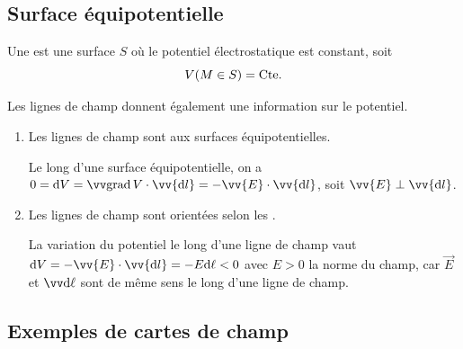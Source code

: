 \documentclass[12pt,fancy]{cours}
\begin{document}
%
%



\subsection{Surface équipotentielle}

\begin{definition}
Une   est une surface $S$ où le potentiel électrostatique est constant, soit
\begin{equation*}
V(M\in S) = \text{Cte}.
\end{equation*}
\end{definition}
\noindent Les lignes de champ donnent également une information sur le potentiel.
\begin{enumerate}
  \item Les lignes de champ sont  aux surfaces équipotentielles.
  
  \begin{preuve}
    Le long d’une surface équipotentielle, on a $
 0=\d V=\grad{V}\cdot\vv{\d l}=-\vv{E}\cdot\vv{\d l} $, soit
$\vv{E}\perp\vv{\d l}$.
  \end{preuve}

  \item Les lignes de champ sont orientées selon les .
  
  \begin{preuve}
    La variation du potentiel le long d’une ligne de champ vaut $\d V = -\vv{E}\cdot\vv{\d l} = -E\d \ell < 0$ avec $E>0$ la norme du champ, car $\Vec{E}$ et $\dl$ sont de même sens le long d'une ligne de champ. 
  \end{preuve}
\end{enumerate}

\subsection{Exemples de cartes de champ}
\end{document}
